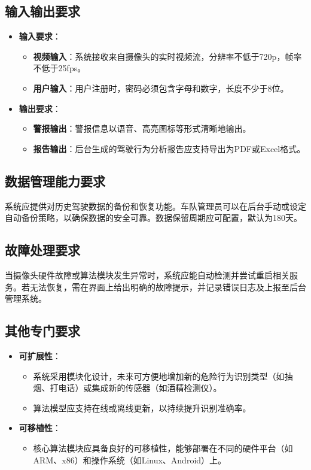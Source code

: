\documentclass[a4paper,12pt]{article}
\begin{document}
\subsection{输入输出要求}
\begin{itemize}
    \item \textbf{输入要求}：
    \begin{itemize}
        \item \textbf{视频输入}：系统接收来自摄像头的实时视频流，分辨率不低于720p，帧率不低于25fps。
        \item \textbf{用户输入}：用户注册时，密码必须包含字母和数字，长度不少于8位。
    \end{itemize}
    \item \textbf{输出要求}：
    \begin{itemize}
        \item \textbf{警报输出}：警报信息以语音、高亮图标等形式清晰地输出。
        \item \textbf{报告输出}：后台生成的驾驶行为分析报告应支持导出为PDF或Excel格式。
    \end{itemize}
\end{itemize}

\subsection{数据管理能力要求}
系统应提供对历史驾驶数据的备份和恢复功能。车队管理员可以在后台手动或设定自动备份策略，以确保数据的安全可靠。数据保留周期应可配置，默认为180天。

\subsection{故障处理要求}
当摄像头硬件故障或算法模块发生异常时，系统应能自动检测并尝试重启相关服务。若无法恢复，需在界面上给出明确的故障提示，并记录错误日志及上报至后台管理系统。

\subsection{其他专门要求}
\begin{itemize}
    \item \textbf{可扩展性}：
    \begin{itemize}
        \item 系统采用模块化设计，未来可方便地增加新的危险行为识别类型（如抽烟、打电话）或集成新的传感器（如酒精检测仪）。
        \item 算法模型应支持在线或离线更新，以持续提升识别准确率。
    \end{itemize}
    \item \textbf{可移植性}：
    \begin{itemize}
        \item 核心算法模块应具备良好的可移植性，能够部署在不同的硬件平台（如ARM、x86）和操作系统（如Linux、Android）上。
    \end{itemize}
\end{itemize}
\end{document}
